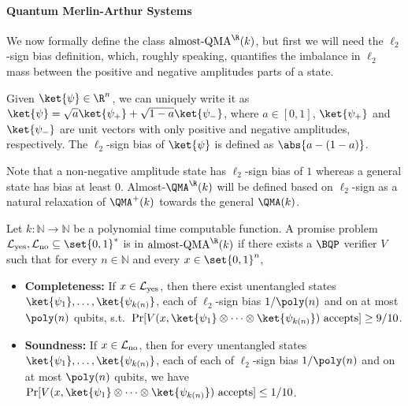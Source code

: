 \paragraph{Quantum Merlin-Arthur Systems}
We now formally define the class $\textup{almost-QMA}^{\R}(k)$, but
first we will need the $\ell_2$-sign bias definition, which, roughly
speaking, quantifies the imbalance in $\ell_2$ mass between the
positive and negative amplitudes parts of a state.

\begin{definition}\label{def:ell2_sign_bias}
  Given $\ket{\psi} \in \R^n$, we can uniquely write it as $\ket{\psi}= \sqrt{a} \ket{\psi_+} + \sqrt{1-a} \ket{\psi_{-}}$,
  where $a \in [0,1]$, $\ket{\psi_{+}}$ and $\ket{\psi_{-}}$ are unit vectors with only positive and negative amplitudes, respectively.
  The $\ell_2$-sign bias of $\ket{\psi}$ is defined as $\abs{a-(1-a)}$.
\end{definition}

  Note that a non-negative amplitude state has $\ell_2$-sign bias of $1$ whereas a general
  state has bias at least $0$.
  \textup{Almost}-$\QMA^\R(k)$ will be defined based on $\ell_2$-sign as a natural relaxation of $\QMA^+(k)$ towards the general $\QMA(k)$. 


\begin{definition}\label{def:almost_qma_k}
  Let $k \colon \mathbb{N} \to \mathbb{N}$ be a polynomial time computable function.
  A promise problem $\mathcal{L}_{\textup{yes}},\mathcal{L}_{\textup{no}} \subseteq \set{0,1}^*$ is in $\textup{almost-QMA}^\R(k)$ if there exists a $\BQP$
  verifier $V$ such that for every $n \in \mathbb{N}$ and every $x \in \set{0,1}^n$, 
  \begin{itemize}[label={}]
  \item \textbf{\textup{Completeness:}} If $x \in \mathcal{L}_{\textup{yes}}$, then there exist unentangled states $\ket{\psi_1}, \ldots, \ket{\psi_{k(n)}}$, each of $\ell_2$-sign
    bias $1/\poly(n)$ and on at most $\poly(n)$ qubits,
    s.t.\ $\Pr[V(x, \ket{\psi_1} \otimes \cdots \otimes \ket{\psi_{k(n)}})\textup{ accepts}] \ge 9/10$.
\vspace{\parsep}
    \item \textbf{\textup{Soundness:}} If $x \in \mathcal{L}_{\textup{no}}$, then for every unentangled states $\ket{\psi_1}, \ldots, \ket{\psi_{k(n)}}$, each of each of $\ell_2$-sign
    bias $1/\poly(n)$ and on at most $\poly(n)$ qubits,
    we have \ $\Pr[V(x, \ket{\psi_1} \otimes \cdots \otimes \ket{\psi_{k(n)}})\textup{ accepts}] \le 1/10$.
  \end{itemize}
\end{definition}

